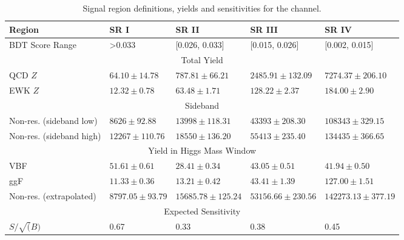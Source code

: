 \begin{table}[]
\centering
\caption{Signal region definitions, yields and sensitivities for the \fourcentral channel. }
\label{tab:BDTReg4cen_alt}
\begin{tabular}{|l|l|l|l|l|}
\hline
Region                       & SR I                & SR II                      & SR III                     & SR IV                      \\ \hline
BDT Score Range              & \textgreater0.033   & [0.026, 0.033]             & [0.015, 0.026]             & [0.002, 0.015]             \\ \hline
\multicolumn{5}{|c|}{Total Yield}                                                                                                         \\ \hline
QCD $Z$                      & $64.10 \pm 14.78$   & $787.81 \pm 66.21$         & $2485.91 \pm 132.09$       & $7274.37 \pm 206.10$       \\ \cline{2-5} 
EWK $Z$                      & $12.32 \pm 0.78$    & $63.48 \pm 1.71$           & $128.22 \pm 2.37$          & $184.00 \pm 2.90$          \\ \hline
\multicolumn{5}{|c|}{Sideband}                                                                                                            \\ \hline
Non-res. (sideband low)  & $8626 \pm 92.88$    & $13998 \pm 118.31 $        & $43393 \pm 208.30$         & $108343 \pm 329.15$        \\ \cline{2-5} 
Non-res. (sideband high) & $12267 \pm 110.76$  & $18550 \pm 136.20$         & $55413 \pm 235.40$         & $134435 \pm 366.65$        \\ \hline
\multicolumn{5}{|c|}{Yield in Higgs Mass Window}                                                                                          \\ \hline
VBF                          & $51.61 \pm 0.61$    & $28.41\pm 0.34$            & $43.05\pm 0.51$            & $41.94\pm 0.50$            \\ \cline{2-5} 
ggF                          & $11.33 \pm 0.36$    & $13.21 \pm 0.42$           & $43.41 \pm 1.39$           & $127.00 \pm 1.51$          \\ \cline{2-5} 
Non-res. (extrapolated)   & $8797.05 \pm 93.79$ & $15685.78\pm 125.24$       & $53156.66\pm 230.56$       & $142273.13\pm 377.19$      \\ \hline
\multicolumn{5}{|c|}{Expected Sensitivity}                                                                                                \\ \hline
$S/ \sqrt(B)$                & 0.67                & 0.33                       & 0.38                       & 0.45                       \\ \hline
\end{tabular}
\end{table}


